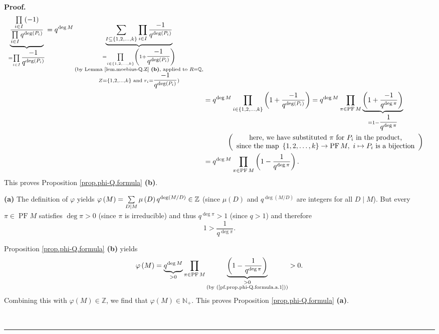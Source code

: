 \documentclass[numbers=enddot,12pt,final,onecolumn,notitlepage]{scrartcl}%
\theoremstyle{definition}
\newenvironment{proof}[1][Proof]{\noindent\textbf{#1.} }{\ \rule{0.5em}{0.5em}}
\let\sumnonlimits\sum
\let\prodnonlimits\prod
\renewcommand{\sum}{\sumnonlimits\limits}
\renewcommand{\prod}{\prodnonlimits\limits}
\begin{document}
\begin{proof}
\begin{align*}
\underbrace{\dfrac{\prod_{i\in I}\left(  -1\right)  }{\prod_{i\in I}%
q^{\deg\left(  P_{i}\right)  }}}_{=\prod_{i\in I}\dfrac{-1}{q^{\deg\left(
P_{i}\right)  }}}=q^{\deg M}\underbrace{\sum_{I\subseteq\left\{
1,2,\ldots,k\right\}  }\prod_{i\in I}\dfrac{-1}{q^{\deg\left(  P_{i}\right)
}}}_{\substack{=\prod_{i\in\left\{  1,2,\ldots,k\right\}  }\left(
1+\dfrac{-1}{q^{\deg\left(  P_{i}\right)  }}\right)  \\\text{(by Lemma
\ref{lem.moebius-Q.Z} \textbf{(b)}, applied to }R=\mathbb{Q}\text{,}%
\\Z=\left\{  1,2,\ldots,k\right\}  \text{ and }r_{i}=\dfrac{-1}{q^{\deg\left(
P_{i}\right)  }}\text{)}}}\\
&  =q^{\deg M}\prod_{i\in\left\{  1,2,\ldots,k\right\}  }\left(  1+\dfrac
{-1}{q^{\deg\left(  P_{i}\right)  }}\right)  =q^{\deg M}\prod_{\pi
\in\operatorname*{PF}M}\underbrace{\left(  1+\dfrac{-1}{q^{\deg\pi}}\right)
}_{=1-\dfrac{1}{q^{\deg\pi}}}\\
&  \ \ \ \ \ \ \ \ \ \ \left(
\begin{array}
[c]{c}%
\text{here, we have substituted }\pi\text{ for }P_{i}\text{ in the product,}\\
\text{since the map }\left\{  1,2,\ldots,k\right\}  \rightarrow
\operatorname*{PF}M,\ i\mapsto P_{i}\text{ is a bijection}%
\end{array}
\right) \\
&  =q^{\deg M}\prod_{\pi\in\operatorname*{PF}M}\left(  1-\dfrac{1}{q^{\deg\pi
}}\right)  .
\end{align*}
This proves Proposition \ref{prop.phi-Q.formula} \textbf{(b)}.

\textbf{(a)} The definition of $\varphi$ yields $\varphi\left(  M\right)
=\sum\limits_{D\mid M}\mu\left(  D\right)  q^{\deg\left(  M/D\right)  }%
\in\mathbb{Z}$ (since $\mu\left(  D\right)  $ and $q^{\deg\left(  M/D\right)
}$ are integers for all $D\mid M$). But every $\pi\in\operatorname*{PF}M$
satisfies $\deg\pi>0$ (since $\pi$ is irreducible) and thus $q^{\deg\pi}>1$
(since $q>1$) and therefore
\begin{equation}
1>\dfrac{1}{q^{\deg\pi}}. \label{pf.prop.phi-Q.formula.a.1}%
\end{equation}


Proposition \ref{prop.phi-Q.formula} \textbf{(b)} yields%
\[
\varphi\left(  M\right)  =\underbrace{q^{\deg M}}_{>0}\prod\limits_{\pi
\in\operatorname*{PF}M}\underbrace{\left(  1-\dfrac{1}{q^{\deg\pi}}\right)
}_{\substack{>0\\\text{(by (\ref{pf.prop.phi-Q.formula.a.1}))}}}>0.
\]
Combining this with $\varphi\left(  M\right)  \in\mathbb{Z}$, we find that
$\varphi\left(  M\right)  \in\mathbb{N}_{+}$. This proves Proposition
\ref{prop.phi-Q.formula} \textbf{(a)}.


\end{proof}
\end{document}

